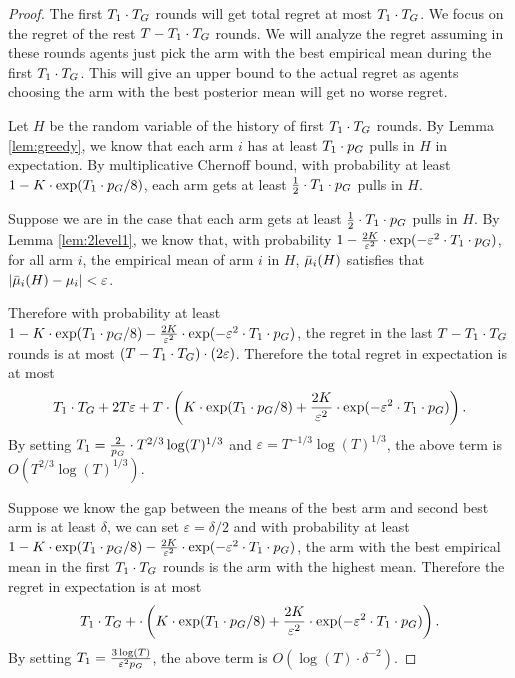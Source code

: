 \begin{proof}
The first $T_1 \cdot T_G$ rounds will get total regret at most $T_1 \cdot T_G$.  We focus on the regret of the rest $T - T_1 \cdot T_G$ rounds. We will analyze the regret assuming in these rounds agents just pick the arm with the best empirical mean during the first $T_1 \cdot T_G$. This will give an upper bound to the actual regret as agents choosing the arm with the best posterior mean will get no worse regret. 

Let $H$ be the random variable of the history of first $T_1 \cdot T_G$ rounds. By Lemma \ref{lem:greedy}, we know that each arm $i$ has at least $T_1 \cdot p_G$  pulls in $H$ in expectation. By multiplicative Chernoff bound, with probability at least $1 - K \cdot \exp(T_1 \cdot p_G/8)$, each arm gets at least $\frac{1}{2} \cdot T_1 \cdot p_G$ pulls in $H$. 

Suppose we are in the case that each arm gets at least $\frac{1}{2} \cdot T_1 \cdot p_G$ pulls in $H$. By Lemma \ref{lem:2level1}, we know that, with probability $1- \frac{2K}{\varepsilon^2} \cdot \exp(-\varepsilon^2 \cdot T_1 \cdot p_G)$, for all arm $i$, the empirical mean of arm $i$ in $H$, $\bar{\mu}_i(H)$ satisfies that $|\bar{\mu}_i(H) - \mu_i| < \varepsilon$. 

Therefore with probability at least $ 1- K \cdot \exp(T_1 \cdot p_G/8) - \frac{2K}{\varepsilon^2} \cdot \exp(-\varepsilon^2 \cdot T_1 \cdot p_G)$, the regret in the last $T - T_1 \cdot T_G$ rounds is at most $(T-T_1 \cdot T_G) \cdot (2\varepsilon )$. Therefore the total regret in expectation is at most 
\[
T_1 \cdot T_G + 2T\varepsilon + T \cdot \left(K \cdot \exp(T_1 \cdot p_G/8) + \frac{2K}{\varepsilon^2} \cdot \exp(-\varepsilon^2 \cdot T_1 \cdot p_G)\right).
\]
By setting $T_1 =\frac{2}{p_G}\cdot T^{2/3} \log(T)^{1/3}$ and $\varepsilon = T^{-1/3} \log(T)^{1/3}$, the above term is $O(T^{2/3}\log(T)^{1/3})$. 

Suppose we know the gap between the means of the best arm and second best arm is at least $\delta$, we can set $\varepsilon = \delta/2$ and with probability at least $1- K \cdot \exp(T_1 \cdot p_G/8) - \frac{2K}{\varepsilon^2} \cdot \exp(-\varepsilon^2 \cdot T_1 \cdot p_G)$, the arm with the best empirical mean in the first $T_1 \cdot T_G$ rounds is the arm with the highest mean. Therefore the regret in expectation is at most
\[
T_1 \cdot T_G + \cdot \left(K \cdot \exp(T_1 \cdot p_G/8) + \frac{2K}{\varepsilon^2} \cdot \exp(-\varepsilon^2 \cdot T_1 \cdot p_G)\right).
\]
By setting $T_1 = \frac{3\log(T) }{\varepsilon^2 p_G}$, the above term is $O(\log(T) \cdot \delta^{-2})$. 
\end{proof}